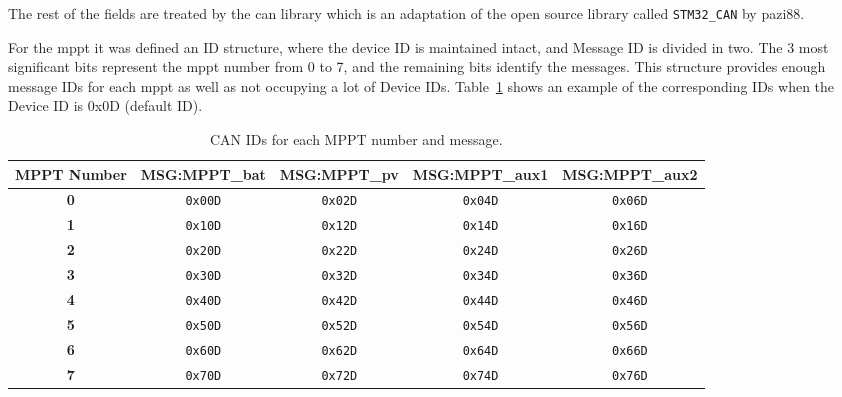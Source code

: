         The rest of the fields are treated by the \ac{can} library which is an adaptation of the open source library called \texttt{STM32\_CAN} by pazi88.

        For the \ac{mppt} it was defined an ID structure, where the device ID is maintained intact, and Message ID is divided in two. The 3 most significant bits represent the \ac{mppt} number from 0 to 7, and the remaining bits identify the messages. This structure provides enough message IDs for each \ac{mppt} as well as not occupying a lot of Device IDs. Table~\ref{tab:mppt_message_ids} shows an example of the corresponding IDs when the Device ID is 0x0D (default ID).

        \begin{table}[!ht]
            \caption{CAN IDs for each MPPT number and message.}
            \centering
            \begin{tabular}{|c|c|c|c|c|}
                \hline
                \textbf{MPPT Number} & \textbf{MSG:MPPT\_bat} & \textbf{MSG:MPPT\_pv} & \textbf{MSG:MPPT\_aux1} & \textbf{MSG:MPPT\_aux2} \\
                \hline
                \textbf{0} & \texttt{0x00D} & \texttt{0x02D} & \texttt{0x04D} & \texttt{0x06D} \\
                \hline
                \textbf{1} & \texttt{0x10D} & \texttt{0x12D} & \texttt{0x14D} & \texttt{0x16D} \\
                \hline
                \textbf{2} & \texttt{0x20D} & \texttt{0x22D} & \texttt{0x24D} & \texttt{0x26D} \\
                \hline
                \textbf{3} & \texttt{0x30D} & \texttt{0x32D} & \texttt{0x34D} & \texttt{0x36D} \\
                \hline
                \textbf{4} & \texttt{0x40D} & \texttt{0x42D} & \texttt{0x44D} & \texttt{0x46D} \\
                \hline
                \textbf{5} & \texttt{0x50D} & \texttt{0x52D} & \texttt{0x54D} & \texttt{0x56D} \\
                \hline
                \textbf{6} & \texttt{0x60D} & \texttt{0x62D} & \texttt{0x64D} & \texttt{0x66D} \\
                \hline
                \textbf{7} & \texttt{0x70D} & \texttt{0x72D} & \texttt{0x74D} & \texttt{0x76D} \\
                \hline
            \end{tabular}
            \label{tab:mppt_message_ids}
        \end{table}

